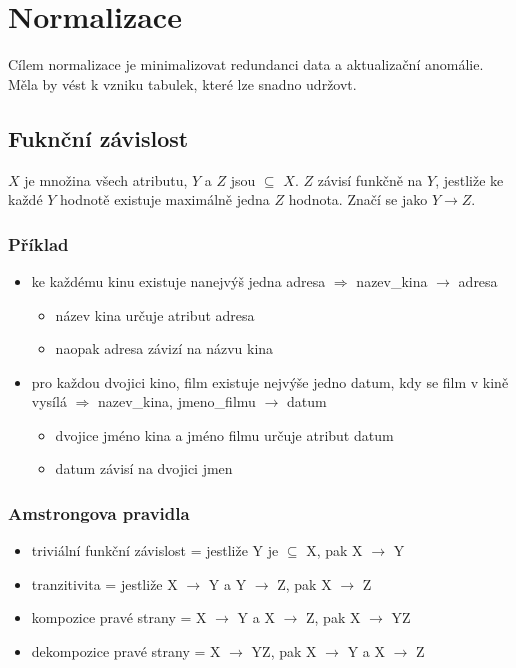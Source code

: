 \documentclass{szzclass}
\begin{document}
\tableofcontents
\newpage

\section{Normalizace}
Cílem normalizace je minimalizovat redundanci data a aktualizační anomálie. Měla by vést k vzniku tabulek,
které lze snadno udržovt.

\subsection{Fuknční závislost}
$X$ je množina všech atributu, $Y$ a $Z$ jsou $\subseteq$ $X$. $Z$ závisí funkčně na $Y$, jestliže ke každé $Y$ hodnotě
existuje maximálně jedna $Z$ hodnota. Značí se jako $Y \rightarrow Z$.

\subsubsection{Příklad}
\begin{itemize}
  \item ke každému kinu existuje nanejvýš jedna adresa $\Rightarrow$ nazev\_kina $\rightarrow$ adresa
  \begin{itemize}
    \item název kina určuje atribut adresa
    \item naopak adresa závizí na názvu kina
  \end{itemize}
  \item pro každou dvojici {kino, film} existuje nejvýše jedno datum, kdy se film v kině vysílá $\Rightarrow$ nazev\_kina, jmeno\_filmu $\rightarrow$ datum
  \begin{itemize}
    \item dvojice jméno kina a jméno filmu určuje atribut datum
    \item datum závisí na dvojici jmen
  \end{itemize}
\end{itemize}
\subsubsection{Amstrongova pravidla}
\begin{itemize}
  \item triviální funkční závislost = jestliže Y je $\subseteq$ X, pak X $\rightarrow$ Y
  \item tranzitivita = jestliže X $\rightarrow$ Y a Y $\rightarrow$ Z, pak X $\rightarrow$ Z
  \item kompozice pravé strany = X $\rightarrow$ Y a X $\rightarrow$ Z, pak X $\rightarrow$ YZ
  \item dekompozice pravé strany = X $\rightarrow$ YZ, pak X $\rightarrow$ Y a X $\rightarrow$ Z
\end{itemize}
\end{document}
